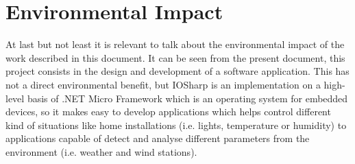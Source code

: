 \section{Environmental Impact}\label{S:Environmental-Impact}
At last but not least it is relevant to talk about the environmental impact of the work described in this document. It can be seen from the present document, this project consists in the design and development of a software application. This has not a direct environmental benefit, but IOSharp is an implementation on a high-level basis of .NET Micro Framework which is an operating system for embedded devices, so it makes easy to develop applications which helps control different kind of situations like home installations (i.e. lights, temperature or humidity) to applications capable of detect and analyse different parameters from the environment (i.e. weather and wind stations).
